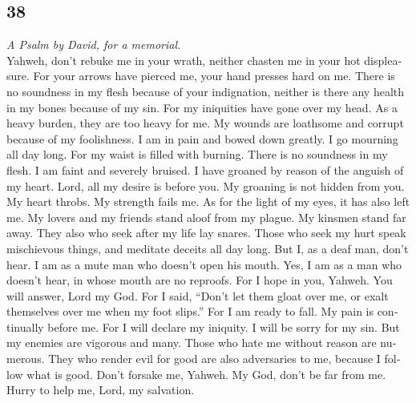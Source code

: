 \begin{paracol}{2}
\switchcolumn
\begin{otherlanguage}{english}

\hypertarget{section-75}{%
\section{38}\label{section-75}}

\emph{A Psalm by David, for a memorial.}\\
 Yahweh, don't rebuke me in your wrath, neither chasten me
in your hot displeasure.  For your arrows have pierced me,
your hand presses hard on me.  There is no soundness in my
flesh because of your indignation, neither is there any health in my
bones because of my sin.  For my iniquities have gone over
my head. As a heavy burden, they are too heavy for me.  My
wounds are loathsome and corrupt because of my foolishness.
 I am in pain and bowed down greatly. I go mourning all
day long.  For my waist is filled with burning. There is
no soundness in my flesh.  I am faint and severely
bruised. I have groaned by reason of the anguish of my heart.
 Lord, all my desire is before you. My groaning is not
hidden from you.  My heart throbs. My strength fails me.
As for the light of my eyes, it has also left me.  My
lovers and my friends stand aloof from my plague. My kinsmen stand far
away.  They also who seek after my life lay snares. Those
who seek my hurt speak mischievous things, and meditate deceits all day
long.  But I, as a deaf man, don't hear. I am as a mute
man who doesn't open his mouth.  Yes, I am as a man who
doesn't hear, in whose mouth are no reproofs.  For I hope
in you, Yahweh. You will answer, Lord my God.  For I
said, ``Don't let them gloat over me, or exalt themselves over me when
my foot slips.''  For I am ready to fall. My pain is
continually before me.  For I will declare my iniquity. I
will be sorry for my sin.  But my enemies are vigorous
and many. Those who hate me without reason are numerous. 
They who render evil for good are also adversaries to me, because I
follow what is good.  Don't forsake me, Yahweh. My God,
don't be far from me.  Hurry to help me, Lord, my
salvation.

\end{otherlanguage}


\end{paracol}
